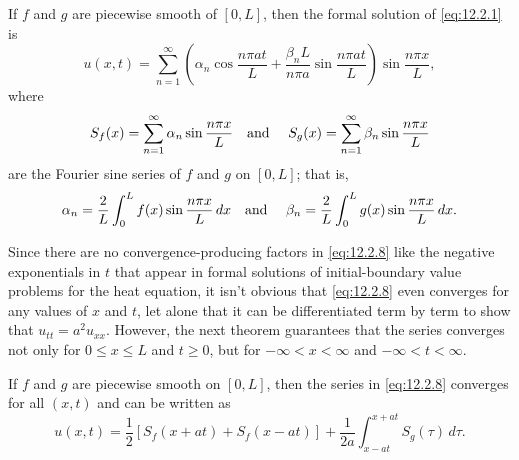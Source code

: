 \begin{definition}
  \color{blue}
  \label{thmtype:12.2.1}\rm If $f$ and $g$ are piecewise smooth of $[0,L]$, then the formal solution
  of \eqref{eq:12.2.1} is
  \begin{equation}
    \label{eq:12.2.8}u(x,t)=\sum_{n=1}^{\infty}\left(\alpha_{n}\cos\frac{n\pi at}{L}+\frac{\beta_{n}L}{n\pi a}\sin\frac{n\pi at}{L}\right) \sin\frac{n\pi x}{L},
  \end{equation}
  where
  \[
    S_{f}(x)=\sum_{n=1}^{\infty}\alpha_{n}\sin\frac{n\pi x}{L}\mbox{\quad and \quad}S_{g}(x)=\sum_{n=1}^{\infty}\beta_{n}\sin\frac{n\pi x}{L}
  \]
  are the Fourier sine series of $f$ and $g$ on $[0,L]$; that is,
  \[
    \alpha_{n}=\frac{2}{L}\int_{0}^{L}f(x)\sin\frac{n\pi x}{L}\,dx \mbox{\quad and \quad}\beta_{n}=\frac{2}{L}\int_{0}^{L}g(x)\sin\frac{n\pi x}{L}\,dx.
  \]
\end{definition}

Since there are no convergence-producing factors in \eqref{eq:12.2.8} like the negative exponentials
in $t$ that appear in formal solutions of initial-boundary value problems for the heat equation, it
isn't obvious that \eqref{eq:12.2.8} even converges for any values of $x$ and $t$, let alone that it
can be differentiated term by term to show that $u_{tt}=a^{2}u_{xx}$. However, the next theorem
guarantees that the series converges not only for $0\le x\le L$ and $t\ge0$, but for
$-\infty<x<\infty$ and $-\infty<t<\infty$.

\begin{theorem}
  \color{blue}
  \label{thmtype:12.2.2} If $f$ and $g$ are piecewise smooth on $[0,L]$, then the series in
  \eqref{eq:12.2.8} converges for all $(x,t)$ and can be written as
  \begin{equation}
    \label{eq:12.2.9}u(x,t)=\frac{1}{2}[S_{f}(x+at)+S_{f}(x-at)]+ \frac{1}{2a}\int_{x-at}^{x+at}S_{g}(\tau)\,d\tau.
  \end{equation}
\end{theorem}

